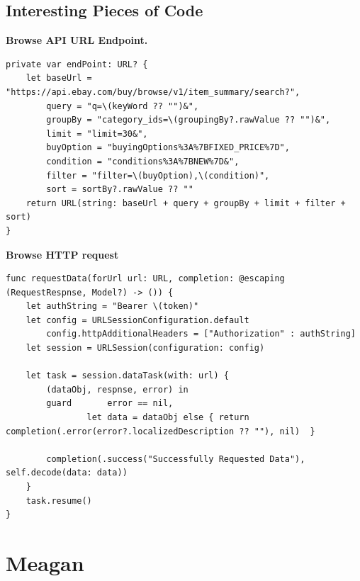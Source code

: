 \documentclass[onecolumn, draftclsnofoot,10pt, compsoc]{IEEEtran}
\begin{document}
\subsection{Interesting Pieces of Code}
\noindent\textbf{Browse API URL Endpoint.}
\begin{lstlisting}
private var endPoint: URL? {
    let baseUrl = "https://api.ebay.com/buy/browse/v1/item_summary/search?",
        query = "q=\(keyWord ?? "")&",
        groupBy = "category_ids=\(groupingBy?.rawValue ?? "")&",
        limit = "limit=30&",
        buyOption = "buyingOptions%3A%7BFIXED_PRICE%7D",
        condition = "conditions%3A%7BNEW%7D&",
        filter = "filter=\(buyOption),\(condition)",
        sort = sortBy?.rawValue ?? ""
    return URL(string: baseUrl + query + groupBy + limit + filter + sort)
}
\end{lstlisting}
\noindent\textbf{Browse HTTP request}
\begin{lstlisting}
func requestData(forUrl url: URL, completion: @escaping (RequestRespnse, Model?) -> ()) {
    let authString = "Bearer \(token)"
    let config = URLSessionConfiguration.default
        config.httpAdditionalHeaders = ["Authorization" : authString]
    let session = URLSession(configuration: config)

    let task = session.dataTask(with: url) {
        (dataObj, respnse, error) in
        guard       error == nil,
                let data = dataObj else { return completion(.error(error?.localizedDescription ?? ""), nil)  }

        completion(.success("Successfully Requested Data"), self.decode(data: data))
    }
    task.resume()
}
\end{lstlisting}   

\section{Meagan}
\end{document}
